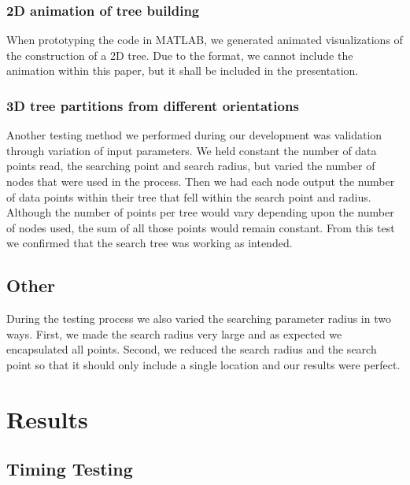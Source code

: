 \documentclass{article}
\begin{document}
\subsubsection{2D animation of tree building}
When prototyping the code in MATLAB, we generated animated visualizations of the construction of a 2D tree. Due to the format, we cannot include the animation within this paper, but it shall be included in the presentation.


\subsubsection{3D tree partitions from different orientations}
Another testing method we performed during our development was validation through variation of input parameters. We held constant the number of data points read, the searching point and search radius, but varied the number of nodes that were used in the process. Then we had each node output the number of data points within their tree that fell within the search point and radius. Although the number of points per tree would vary depending upon the number of nodes used, the sum of all those points would remain constant. From this test we confirmed that the search tree was working as intended. 

\subsection{Other}
During the testing process we also varied the searching parameter radius in two ways. First, we made the search radius very large and as expected we encapsulated all points. Second, we reduced the search radius and the search point so that it should only include a single location and our results were perfect. 

%
%

\section{Results}


%
%

\subsection{Timing Testing}


%
%
\end{document}

